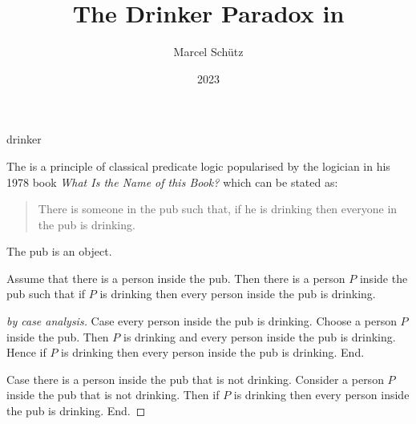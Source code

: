 \documentclass{stex}
\begin{document}
\title{The Drinker Paradox in \Naproche}
\author{Marcel Schütz}
\date{2023}
\maketitle
\begin{smodule}{drinker}
\begin{sparagraph}
  \noindent The \emph{} is a principle of classical predicate logic popularised by the logician  in his 1978 book \textit{What Is the Name of this Book?} \cite{Smullyan1978} which can be stated as:

  \begin{quotation}
    \noindent There is someone in the pub such that, if he is drinking then everyone in the pub is drinking.
  \end{quotation}
\end{sparagraph}

\begin{forthel}

  \begin{signature*}
    The pub is an object.
  \end{signature*}

  \begin{theorem*}\label{drinker_paradox}
    Assume that there is a person inside the pub.
    Then there is a person $P$ inside the pub such that if $P$ is drinking then every person inside the pub is drinking.
  \end{theorem*}
  \begin{proof}[ by case analysis]
    Case every person inside the pub is drinking.
      Choose a person $P$ inside the pub.
      Then $P$ is drinking and every person inside the pub is drinking.
      Hence if $P$ is drinking then every person inside the pub is drinking.
    End.

    Case there is a person inside the pub that is not drinking.
      Consider a person $P$ inside the pub that is not drinking.
      Then if $P$ is drinking then every person inside the pub is drinking.
    End.
  \end{proof}
\end{forthel}
\end{smodule}
\printbibliography
\end{document}
